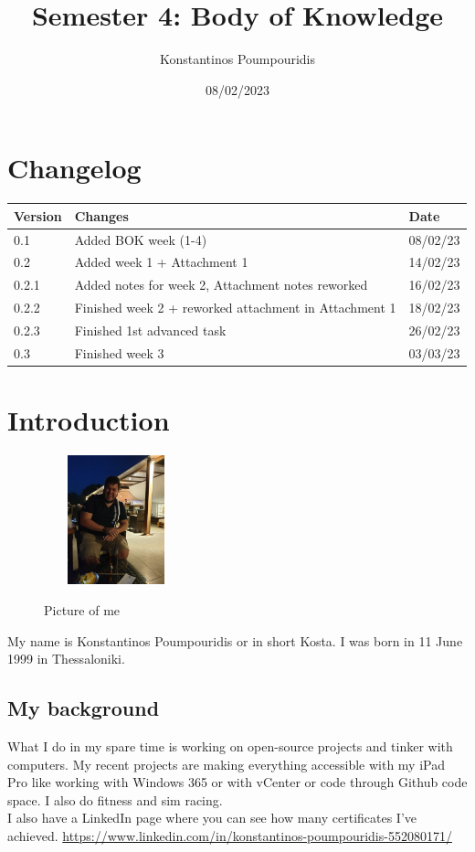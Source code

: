 \documentclass[12pt, letterpaper]{article}
\title{Semester 4: Body of Knowledge}
\author{Konstantinos Poumpouridis}
\date{08/02/2023}
\begin{document}
\maketitle
\thispagestyle{empty}
    
\newpage
\section{Changelog}
    \begin{table}[htbp]
        \begin{tabular}{|l|l|l|}
            \hline
            Version & Changes         & Date   \tabularnewline \hline
            0.1     & Added BOK week (1-4) & 08/02/23 \tabularnewline \hline
        0.2  &  Added week 1 + Attachment 1 & 14/02/23 \tabularnewline \hline
       0.2.1     &    Added notes for week 2, Attachment notes reworked     &  16/02/23      \tabularnewline \hline
       0.2.2  &  Finished week 2 + reworked attachment in Attachment 1 & 18/02/23 \tabularnewline \hline
       0.2.3  &  Finished 1st advanced task  & 26/02/23 \tabularnewline \hline
       0.3  &  Finished week 3  & 03/03/23 \tabularnewline \hline
        \end{tabular}
    \end{table}
\newpage
\tableofcontents
\newpage
\section{Introduction}
\begin{figure}
    \includegraphics[width=0.25\textwidth]{fotos/Kosta.jpeg}
    \caption{Picture of me}
\end{figure}
My name is Konstantinos Poumpouridis or in short Kosta. I was born in 11 June 1999 in Thessaloniki.

\subsection{My background}

What I do in my spare time is working on open-source projects and tinker with computers. My recent projects are making everything accessible with my iPad Pro like working with Windows 365 or with vCenter or code through Github code space. I also do fitness and sim racing.
\hfill\break
\\
I also have a LinkedIn page where you can see how many certificates I've achieved.
\hfill\break
\url{https://www.linkedin.com/in/konstantinos-poumpouridis-552080171/}
\\
\newpage
\end{document}
